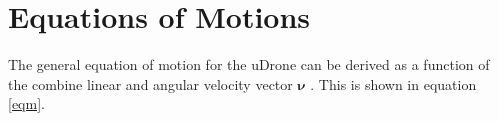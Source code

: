 


\section{Equations of Motions}

The general equation of motion for the uDrone can be derived as a function of the combine linear and angular velocity vector $\boldsymbol{\nu}$ \parencite{thor_mod}. This is shown in equation \ref{eqm}.

